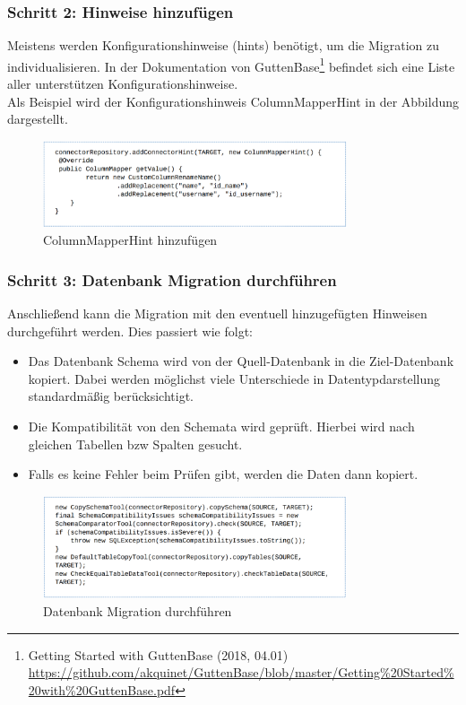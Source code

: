 \subsubsection*{Schritt 2: Hinweise hinzufügen}
Meistens werden Konfigurationshinweise (hints) benötigt, um die Migration zu individualisieren. In der Dokumentation von GuttenBase\footnote{Getting Started with GuttenBase (2018, 04.01) \\ \url{https://github.com/akquinet/GuttenBase/blob/master/Getting\%20Started\%20with\%20GuttenBase.pdf}} befindet sich eine Liste aller unterstützen Konfigurationshinweise. \\
Als Beispiel wird der Konfigurationshinweis ColumnMapperHint in der Abbildung dargestellt.
\begin{figure}[H]
	\centering
	\includegraphics[width=0.8\textwidth]{images/gb/rename}
	\caption{ColumnMapperHint hinzufügen}
	\label{img:gb/rename}
\end{figure}


\subsubsection*{Schritt 3: Datenbank Migration durchführen}
Anschließend kann die Migration mit den eventuell hinzugefügten Hinweisen durchgeführt werden. Dies passiert wie folgt:
\begin{itemize}
	\item Das Datenbank Schema wird von der Quell-Datenbank in die Ziel-Datenbank kopiert. Dabei werden möglichst viele Unterschiede in Datentypdarstellung standardmäßig berücksichtigt.
	\item Die Kompatibilität von den Schemata wird geprüft. Hierbei wird nach gleichen Tabellen bzw Spalten gesucht.
	\item Falls es keine Fehler beim Prüfen gibt, werden die Daten dann kopiert.
\end{itemize}
\begin{figure}[H]
	\centering
	\includegraphics[width=0.8\textwidth]{images/gb/copy}
	\caption{Datenbank Migration durchführen}
	\label{img:gb/copy}
\end{figure}




